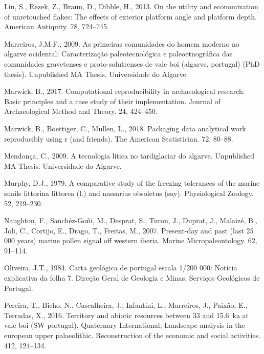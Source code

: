 \documentclass[12pt,twoside]{reedthesis}
\begin{document}
\leavevmode\hypertarget{ref-linetal2013}{}%
Lin, S., Rezek, Z., Braun, D., Dibble, H., 2013. On the utility and economization of unretouched flakes: The effects of exterior platform angle and platform depth. American Antiquity. 78, 724--745.

\leavevmode\hypertarget{ref-marreiros2009}{}%
Marreiros, J.M.F., 2009. As primeiras comunidades do homem moderno no algarve ocidental: Caracterização paleotecnológica e paleoetnográfica das comunidades gravetenses e proto-solutrenses de vale boi (algarve, portugal) (PhD thesis). Unpublished MA Thesis. Universidade do Algarve.

\leavevmode\hypertarget{ref-marwick2017}{}%
Marwick, B., 2017. Computational reproducibility in archaeological research: Basic principles and a case study of their implementation. Journal of Archaeological Method and Theory. 24, 424--450.

\leavevmode\hypertarget{ref-marwick2018}{}%
Marwick, B., Boettiger, C., Mullen, L., 2018. Packaging data analytical work reproducibly using r (and friends). The American Statistician. 72, 80--88.

\leavevmode\hypertarget{ref-mendonca2009}{}%
Mendonça, C., 2009. A tecnologia lítica no tardiglaciar do algarve. Unpublished MA Thesis. Universidade do Algarve.

\leavevmode\hypertarget{ref-murphy1979}{}%
Murphy, D.J., 1979. A comparative study of the freezing tolerances of the marine snails littorina littorea (l.) and nassarius obsoletus (say). Physiological Zoology. 52, 219--230.

\leavevmode\hypertarget{ref-naughton2007}{}%
Naughton, F., Sanchéz-Goñi, M., Desprat, S., Turon, J., Duprat, J., Malaizé, B., Joli, C., Cortijo, E., Drago, T., Freitas, M., 2007. Present-day and past (last 25 000 years) marine pollen signal off western iberia. Marine Micropaleontology. 62, 91--114.

\leavevmode\hypertarget{ref-oliveira1984}{}%
Oliveira, J.T., 1984. Carta geológica de portugal escala 1/200 000: Notícia explicativa da folha 7. Direção Geral de Geologia e Minas, Serviços Geológicos de Portugal.

\leavevmode\hypertarget{ref-pereira2016}{}%
Pereira, T., Bicho, N., Cascalheira, J., Infantini, L., Marreiros, J., Paixão, E., Terradas, X., 2016. Territory and abiotic resources between 33 and 15.6~ka at vale boi (SW portugal). Quaternary International, Landscape analysis in the european upper palaeolithic. Reconstruction of the economic and social activities. 412, 124--134.
\end{document}
